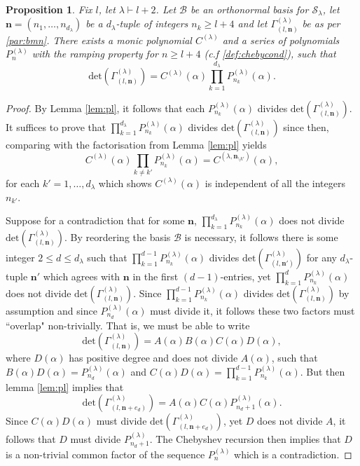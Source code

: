 \documentclass{article}
\newtheorem{proposition}[theorem]{Proposition}
\theoremstyle{definition}
\def\SS{\mathcal{S}} %
\def\BB{\mathcal{B}} %
\def\a{\alpha}
\def\l{\lambda}
\numberwithin{equation}{subsection}
\begin{document}
\begin{proposition}\label{prop:main}
    Fix $l$, let $\l \vdash l+2$. Let $\BB$ be an orthonormal basis for $\SS_\l$, let $\bm{n}=(n_1,\dots, n_{d_\l})$ be a $d_\l$-tuple of integers $n_k\geq l+4$ and let $\Gamma_{(l,\bm{n})}^{(\l)}$ be as per \ref{par:bmn}. There exists a monic polynomial $C^{(\l)}$ and a series of polynomials $P^{(\l)}_{n}$ with the ramping property for $n\geq l+4$ (\textit{c.f} \ref{def:chebycond}), such that 
\[ \text{det}(\Gamma_{(l,\bm{n})}^{(\l)})=C^{(\l)}(\a) \prod_{k=1}^{d_{\l}} P^{(\l)}_{n_k}(\a).\]\end{proposition}
\begin{proof} By Lemma \ref{lem:pl}, it follows that each $P^{(\l)}_{n_k}(\a)$ divides $\text{det}(\Gamma_{(l,\bm{n})}^{(\l)})$. It suffices to prove that $\prod_{k=1}^{d_{\l}} P^{(\l)}_{n_k}(\a)$ divides $\text{det}(\Gamma_{(l,\bm{n})}^{(\l)})$ since then, comparing with the factorisation from Lemma \ref{lem:pl} yields
\[ C^{(\l)}(\a) \prod_{k\neq k' } P^{(\l)}_{n_k}(\a)= C^{(\l,\bm{n}_{\setminus k'})}(\a), \]
for each $k'=1,\dots, d_{\l}$ which shows $C^{(\l)}(\a)$ is independent of all the integers $n_{k'}$. 

Suppose for a contradiction that for some $\bm{n}$, $\prod_{k=1}^{d_{\l}} P^{(\l)}_{n_k}(\a)$ does not divide $\text{det}(\Gamma_{(l,\bm{n})}^{(\l)})$. By reordering the basis $\BB$ is necessary, it follows there is some integer $2\leq d \leq d_{\l}$ such that $\prod_{k=1}^{d-1} P^{(\l)}_{n_k}(\a)$ divides $\text{det}(\Gamma_{(l,\bm{n'})}^{(\l)})$ for any $d_\l$-tuple $\bm{n'}$ which agrees with $\bm{n}$ in the first $(d-1)$-entries, yet $\prod_{k=1}^{d} P^{(\l)}_{n_k}(\a)$ does not divide $\text{det}(\Gamma_{(l,\bm{n})}^{(\l)})$. Since $\prod_{k=1}^{d-1} P^{(\l)}_{n_k}(\a)$ divides $\text{det}(\Gamma_{(l,\bm{n})}^{(\l)})$ by assumption and since $P^{(\l)}_{n_{d}}(\a)$ must divide it, it follows these two factors must ``overlap" non-trivially. That is, we must be able to write
\[ \text{det}(\Gamma_{(l,\bm{n})}^{(\l)})= A(\a) B(\a) C(\a) D(\a),\]
where $D(\a)$ has positive degree and does not divide $A(\a)$, such that $B(\a) D(\a)= P^{(\l)}_{n_{d}}(\a)$ and $C(\a) D(\a)= \prod_{k=1}^{d-1} P^{(\l)}_{n_k}(\a)$. But then lemma \ref{lem:pl} implies that   
\[\text{det}(\Gamma_{(l,\bm{n}+e_{d})}^{(\l)})= A(\a) C(\a)  P^{(\l)}_{n_{d}+1}(\a). \]
Since $C(\a)D(\a)$ must divide $\text{det}(\Gamma_{(l,\bm{n}+e_{d})}^{(\l)})$, yet $D$ does not divide $A$, it follows that $D$ must divide $P^{(\l)}_{n_{d}+1}$. The Chebyshev recursion then implies that $D$ is a non-trivial common factor of the sequence $P^{(\l)}_{n}$ which is a contradiction.\end{proof}
\end{document}
